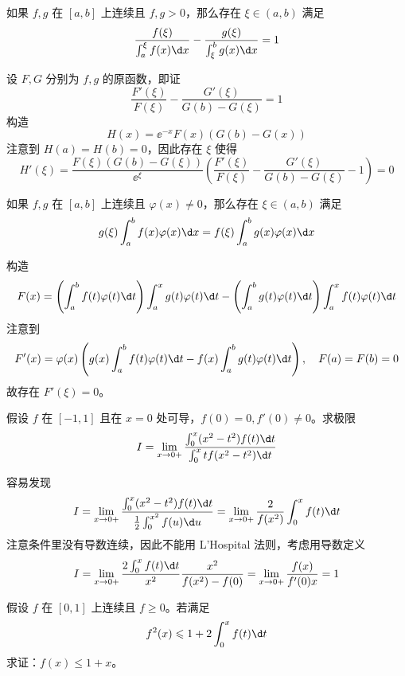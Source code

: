 \begin{problem}[000051]
如果 $f,g$ 在 $[a,b]$ 上连续且 $f, g > 0$，那么存在 $\xi \in (a,b)$ 满足
\[ \frac{f(\xi)}{\int_{a}^{\xi} f(x) \d x} - \frac{g(\xi)}{\int_{\xi}^{b} g(x) \d x} = 1 \]
\end{problem}

\begin{solution}
	设 $F, G$ 分别为 $f, g$ 的原函数，即证
	\[ \frac{F'(\xi)}{F(\xi)} - \frac{G'(\xi)}{G(b) - G(\xi)} = 1 \]
	构造
	\[ H(x) = \ee^{-x} F(x) (G(b) - G(x)) \]
	注意到 $H(a) = H(b) = 0$，因此存在 $\xi$ 使得
	\[ H'(\xi) = \frac{F(\xi) (G(b) - G(\xi))}{\ee^{\xi}} \left(\frac{F'(\xi)}{F(\xi)} - \frac{G'(\xi)}{G(b) - G(\xi)} - 1\right) = 0 \]
\end{solution}

\begin{problem}[000052]
如果 $f,g$ 在 $[a,b]$ 上连续且 $\varphi(x) \neq 0$，那么存在 $\xi \in (a,b)$ 满足
\[ g(\xi) \int_{a}^{b} f(x) \varphi(x) \d x = f(\xi) \int_{a}^{b} g(x) \varphi(x) \d x \]
\end{problem}

\begin{solution}
	构造
	\[ F(x) = \left(\int_{a}^{b} f(t) \varphi(t) \d t\right) \int_{a}^{x} g(t) \varphi(t) \d t - \left(\int_{a}^{b} g(t)\varphi(t) \d t \right) \int_{a}^{x} f(t) \varphi(t) \d t \]
	注意到
	\[ F'(x) =  \varphi(x)\left(g(x)\int_{a}^{b} f(t) \varphi(t) \d t - f(x) \int_{a}^{b} g(t) \varphi(t) \d t \right), \quad F(a) = F(b) = 0 \]
	故存在 $F'(\xi) = 0$。
\end{solution}

\begin{problem}[000053]
假设 $f$ 在 $[-1, 1]$ 且在 $x=0$ 处可导，$f(0) = 0, f'(0) \neq 0$。求极限
\[ I = \lim_{x \to 0+} \frac{\int_{0}^{x}(x^2 - t^2) f(t) \d t}{\int_{0}^{x} t f(x^2 - t^2) \d t} \]
\end{problem}

\begin{solution}
	容易发现
	\[ I = \lim_{x \to 0+} \frac{\int_{0}^{x} (x^2 - t^2) f(t) \d t}{\frac{1}{2} \int_{0}^{x^2} f(u) \d u} = \lim_{x \to 0+} \frac{2}{f(x^2)}\int_{0}^{x}f(t) \d t \]
	注意条件里没有导数连续，因此不能用 L'Hospital 法则，考虑用导数定义
	\[ I = \lim_{x \to 0+} \frac{2 \int_{0}^{x}f(t) \d t}{x^2} \frac{x^2}{f(x^2) - f(0)} = \lim_{x \to 0+} \frac{f(x)}{f'(0) x} = 1 \]
\end{solution}

\begin{problem}[000054]
假设 $f$ 在 $[0, 1]$ 上连续且 $f \geqslant 0$。若满足
\[ f^2(x) \leqslant 1 + 2 \int_{0}^{x} f(t) \d t \]
求证：$f(x) \leqslant 1 + x$。
\end{problem}

